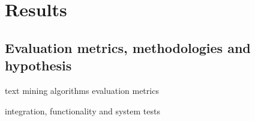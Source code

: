 
\chapter{Results} %
\label{chap:Chapter6} 

\section{Evaluation metrics, methodologies and hypothesis}

text mining algorithms evaluation metrics

integration, functionality and system tests

